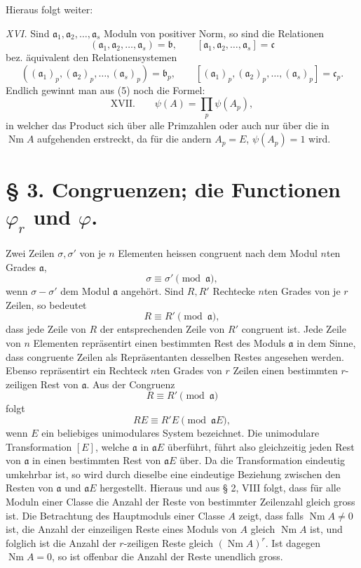\documentclass[11pt,a4paper]{article}
\newcommand{\Nm}{\operatorname{Nm}}
\begin{document}
Hieraus folgt weiter:

\emph{XVI.} Sind $\mathfrak a_1,\mathfrak a_2,\ldots,\mathfrak a_s$ Moduln von positiver Norm, so sind die Relationen
\[
 (\mathfrak a_1,\mathfrak a_2,\ldots,\mathfrak a_s)=\mathfrak b,
 \qquad
 [\mathfrak a_1,\mathfrak a_2,\ldots,\mathfrak a_s]=\mathfrak c
\]
bez. äquivalent den Relationensystemen
\[
 ((\mathfrak a_1)_p,(\mathfrak a_2)_p,\ldots,(\mathfrak a_s)_p)=\mathfrak b_p,
 \qquad
 [(\mathfrak a_1)_p,(\mathfrak a_2)_p,\ldots,(\mathfrak a_s)_p]=\mathfrak c_p.
\]
Endlich gewinnt man aus (5) noch die Formel:
\[
\text{XVII.}\qquad \psi(A)=\prod_p \psi(A_p),
\]
in welcher das Product sich über alle Primzahlen oder auch nur über die in $\Nm A$ aufgehenden erstreckt, da für die andern $A_p=E$, $\psi(A_p)=1$ wird.

\section*{§ 3. Congruenzen; die Functionen $\varphi_r$ und $\varphi$.}

Zwei Zeilen $\sigma,\sigma'$ von je $n$ Elementen heissen congruent nach dem Modul $n$ten Grades $\mathfrak a$,
\[
 \sigma\equiv\sigma'\pmod{\mathfrak a},
\]
wenn $\sigma-\sigma'$ dem Modul $\mathfrak a$ angehört. Sind $R,R'$ Rechtecke $n$ten Grades von je $r$ Zeilen, so bedeutet
\[
 R\equiv R'\pmod{\mathfrak a},
\]
dass jede Zeile von $R$ der entsprechenden Zeile von $R'$ congruent ist. Jede Zeile von $n$ Elementen repräsentirt einen bestimmten Rest des Moduls $\mathfrak a$ in dem Sinne, dass congruente Zeilen als Repräsentanten desselben Restes angesehen werden. Ebenso repräsentirt ein Rechteck $n$ten Grades von $r$ Zeilen einen bestimmten $r$-zeiligen Rest von $\mathfrak a$. Aus der Congruenz
\[
 R\equiv R'\pmod{\mathfrak a}
\]
folgt
\[
 RE\equiv R'E\pmod{\mathfrak aE},
\]
wenn $E$ ein beliebiges unimodulares System bezeichnet. Die unimodulare Transformation $[E]$, welche $\mathfrak a$ in $\mathfrak aE$ überführt, führt also gleichzeitig jeden Rest von $\mathfrak a$ in einen bestimmten Rest von $\mathfrak aE$ über. Da die Transformation eindeutig umkehrbar ist, so wird durch dieselbe eine eindeutige Beziehung zwischen den Resten von $\mathfrak a$ und $\mathfrak aE$ hergestellt. Hieraus und aus § 2, VIII folgt, dass für alle Moduln einer Classe die Anzahl der Reste von bestimmter Zeilenzahl gleich gross ist. Die Betrachtung des Hauptmoduls einer Classe $A$ zeigt, dass falls $\Nm A\ne 0$ ist, die Anzahl der einzeiligen Reste eines Moduls von $A$ gleich $\Nm A$ ist, und folglich ist die Anzahl der $r$-zeiligen Reste gleich $(\Nm A)^r$. Ist dagegen $\Nm A=0$, so ist offenbar die Anzahl der Reste unendlich gross.
\end{document}
